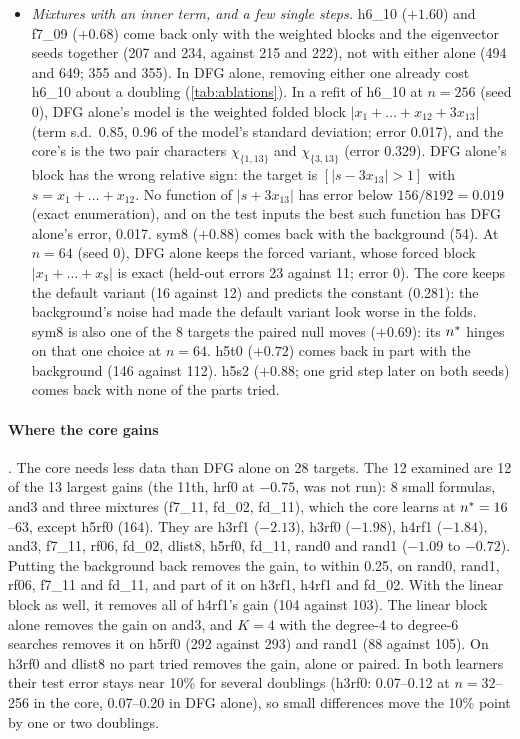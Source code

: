 \begin{itemize}
\item \emph{Mixtures with an inner term, and a few single steps.} h6\_10 ($+1.60$) and f7\_09 ($+0.68$) come back only with the weighted blocks and the eigenvector seeds together (207 and 234, against 215 and 222), not with either alone (494 and 649; 355 and 355). In DFG alone, removing either one already cost h6\_10 about a doubling (\cref{tab:ablations}). In a refit of h6\_10 at $n=256$ (seed 0), DFG alone's model is the weighted folded block $|x_1+\dots+x_{12}+3x_{13}|$ (term s.d.\ 0.85, 0.96 of the model's standard deviation; error 0.017), and the core's is the two pair characters $\chi_{\{1,13\}}$ and $\chi_{\{3,13\}}$ (error 0.329). DFG alone's block has the wrong relative sign: the target is $[|s-3x_{13}|>1]$ with $s=x_1+\dots+x_{12}$. No function of $|s+3x_{13}|$ has error below $156/8192=0.019$ (exact enumeration), and on the test inputs the best such function has DFG alone's error, 0.017. sym8 ($+0.88$) comes back with the background (54). At $n=64$ (seed 0), DFG alone keeps the forced variant, whose forced block $|x_1+\dots+x_8|$ is exact (held-out errors 23 against 11; error 0). The core keeps the default variant (16 against 12) and predicts the constant (0.281): the background's noise had made the default variant look worse in the folds. sym8 is also one of the 8 targets the paired null moves ($+0.69$): its $n^{*}$ hinges on that one choice at $n=64$. h5t0 ($+0.72$) comes back in part with the background (146 against 112). h5s2 ($+0.88$; one grid step later on both seeds) comes back with none of the parts tried.
\end{itemize}

\paragraph{Where the core gains} . The core needs less data than DFG alone on 28 targets. The 12 examined are 12 of the 13 largest gains (the 11th, hrf0 at $-0.75$, was not run): 8 small formulas, and3 and three mixtures (f7\_11, fd\_02, fd\_11), which the core learns at $n^{*}=16$--63, except h5rf0 (164). They are h3rf1 ($-2.13$), h3rf0 ($-1.98$), h4rf1 ($-1.84$), and3, f7\_11, rf06, fd\_02, dlist8, h5rf0, fd\_11, rand0 and rand1 ($-1.09$ to $-0.72$). Putting the background back removes the gain, to within 0.25, on rand0, rand1, rf06, f7\_11 and fd\_11, and part of it on h3rf1, h4rf1 and fd\_02. With the linear block as well, it removes all of h4rf1's gain (104 against 103). The linear block alone removes the gain on and3, and $K=4$ with the degree-4 to degree-6 searches removes it on h5rf0 (292 against 293) and rand1 (88 against 105). On h3rf0 and dlist8 no part tried removes the gain, alone or paired. In both learners their test error stays near 10\% for several doublings (h3rf0: 0.07--0.12 at $n=32$--256 in the core, 0.07--0.20 in DFG alone), so small differences move the 10\% point by one or two doublings.

